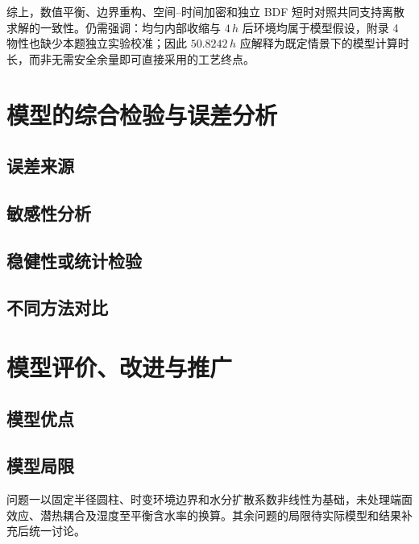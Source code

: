 \documentclass[withoutpreface,bwprint]{cumcmthesis}
\begin{document}
综上，数值平衡、边界重构、空间--时间加密和独立 BDF 短时对照共同支持离散求解的一致性。仍需强调：均匀内部收缩与 $4\,\si{h}$ 后环境均属于模型假设，附录 4 物性也缺少本题独立实验校准；因此 $50.8242\,\si{h}$ 应解释为既定情景下的模型计算时长，而非无需安全余量即可直接采用的工艺终点。

\clearpage
\section{模型的综合检验与误差分析}

\subsection{误差来源}
\vspace{0.08\textheight}

\subsection{敏感性分析}
\vspace{0.08\textheight}

\subsection{稳健性或统计检验}
\vspace{0.08\textheight}

\subsection{不同方法对比}
\vspace{0.08\textheight}

\clearpage
\section{模型评价、改进与推广}

\subsection{模型优点}
\vspace{0.06\textheight}

\subsection{模型局限}

问题一以固定半径圆柱、时变环境边界和水分扩散系数非线性为基础，未处理端面效应、潜热耦合及湿度至平衡含水率的换算。其余问题的局限待实际模型和结果补充后统一讨论。
\end{document}
